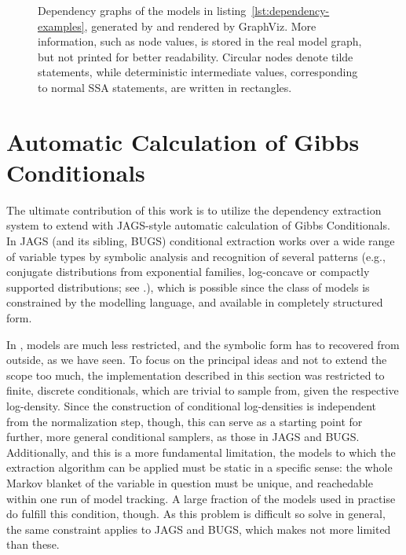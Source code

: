 \begin{figure}[p]
  \caption{Dependency graphs of the models in listing~\ref{lst:dependency-examples}, generated by
    \autogibbsjl{} and rendered by GraphViz.  More information, such as node values, is stored in
    the real model graph, but not printed for better readability.  Circular nodes denote tilde
    statements, while deterministic intermediate values, corresponding to normal SSA statements, are
    written in rectangles.}
  \label{fig:geom-deps}
\end{figure}


\section{Automatic Calculation of Gibbs Conditionals}
\label{sec:automatic-conditionals}

The ultimate contribution of this work is to utilize the dependency extraction system to extend
\turingjl{} with JAGS-style automatic calculation of Gibbs Conditionals.  In JAGS (and its sibling,
BUGS) conditional extraction works over a wide range of variable types \parencite{plummer2003jags}
by symbolic analysis and recognition of several patterns (e.g., conjugate distributions from
exponential families, log-concave or compactly supported distributions; see
\textcite{lunn2000winbugs}.), which is possible since the class of models is constrained by the
modelling language, and available in completely structured form.

In \turingjl{}, models are much less restricted, and the symbolic form has to recovered from
outside, as we have seen.  To focus on the principal ideas and not to extend the scope too much, the
implementation described in this section was restricted to finite, discrete conditionals, which are
trivial to sample from, given the respective log-density.  Since the construction of conditional
log-densities is independent from the normalization step, though, this can serve as a starting point
for further, more general conditional samplers, as those in JAGS and BUGS.  Additionally, and this
is a more fundamental limitation, the models to which the extraction algorithm can be applied must
be static in a specific sense: the whole Markov blanket of the variable in question must be unique,
and reachedable within one run of model tracking.  A large fraction of the models used in practise
do fulfill this condition, though.  As this problem is difficult so solve in general, the same
constraint applies to JAGS and BUGS, which makes \autogibbsjl{} not more limited than these.

